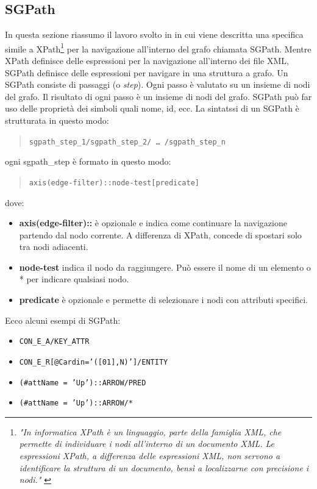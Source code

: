         \subsection{SGPath}
            In questa sezione riassumo il lavoro svolto in \cite{localcontext} in cui viene descritta una specifica simile a XPath\footnote{\textit{"In informatica XPath è un linguaggio, parte della famiglia XML, che permette di individuare i nodi all'interno di un documento XML. Le espressioni XPath, a differenza delle espressioni XML, non servono a identificare la struttura di un documento, bensì a localizzarne con precisione i nodi."} \cite{xpath}} per la navigazione all'interno del grafo chiamata SGPath. Mentre XPath definisce delle espressioni per la navigazione all'interno dei file XML, SGPath definisce delle espressioni per navigare in una struttura a grafo.
            \newline
            Un SGPath consiste di passaggi (o \textit{step}). Ogni passo è valutato su un insieme di nodi del grafo. Il risultato di ogni passo è un insieme di nodi del grafo. SGPath può far uso delle proprietà dei simboli quali nome, id, ecc.
            \newline
            La sintatssi di un SGPath è strutturata in questo modo:
            \begin{quotation}
                \texttt{sgpath\_step\_1/sgpath\_step\_2/ … /sgpath\_step\_n}
            \end{quotation}
            ogni sgpath\_step è formato in questo modo:
            \begin{quotation}
                \texttt{axis(edge-filter)::node-test[predicate]}
            \end{quotation}
            dove:
            \begin{itemize}
                \item \textbf{axis(edge-filter)::} è opzionale e indica come continuare la navigazione partendo dal nodo corrente. A differenza di XPath, concede di spostari solo tra nodi adiacenti.
                \item \textbf{node-test} indica il nodo da raggiungere. Può essere il nome di un elemento o * per indicare qualsiasi nodo.
                \item \textbf{\lbrack predicate\rbrack} è opzionale e permette di selezionare i nodi con attributi specifici.
            \end{itemize}
            Ecco alcuni esempi di SGPath:
            \begin{itemize}
                \item \texttt{CON\_E\_A/KEY\_ATTR}
                \item \texttt{CON\_E\_R[@Cardin='([01],N)']/ENTITY}
                \item \texttt{(\#attName = 'Up')::ARROW/PRED}
                \item \texttt{(\#attName = 'Up')::ARROW/*}
            \end{itemize}
